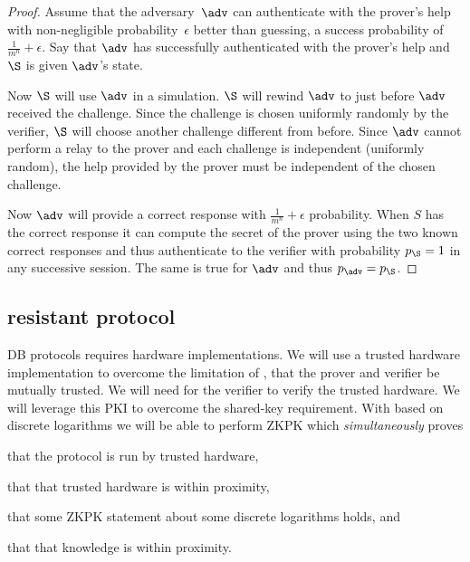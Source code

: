 \begin{proof}
  Assume that the adversary~\(\adv\) can authenticate with the prover's help 
  with non-negligible probability~\(\epsilon\) better than guessing, \ie a 
  success probability of \(\frac{1}{m^n}+\epsilon\).
  Say that \(\adv\) has successfully authenticated with the prover's help and 
  \(\S\) is given \(\adv\)'s state.

  Now \(\S\) will use \(\adv\) in a simulation.
  \(\S\) will rewind \(\adv\) to just before \(\adv\) received the challenge.
  Since the challenge is chosen uniformly randomly by the verifier, \(\S\) will 
  choose another challenge different from before.
  Since \(\adv\) cannot perform a relay to the prover and each challenge is 
  independent (uniformly random), the help provided by the prover must be 
  independent of the chosen challenge.

  Now \(\adv\) will provide a correct response with \(\frac{1}{m^n}+\epsilon\) 
  probability.
  When \(S\) has the correct response it can compute the secret of the prover 
  using the two known correct responses and thus authenticate to the verifier 
  with probability \(p_{\S} = 1\) in any successive session.
  The same is true for \(\adv\) and thus \(p_{\adv} = p_{\S}\).
\end{proof}

\subsection{ resistant protocol}

\Acl{DB} protocols requires hardware implementations.
We will use a trusted hardware implementation to overcome the limitation of 
\textcite{UWBPR}, \ie that the prover and verifier be mutually trusted.
We will need  for the verifier to verify the trusted hardware.
We will leverage this \ac{PKI} to overcome the shared-key requirement.
With  based on discrete logarithms we will be able to perform  
\ac{ZKPK} which \emph{simultaneously} proves
\begin{enumerate*}
\item that the protocol is run by trusted hardware,
\item that that trusted hardware is within proximity,
\item that some \ac{ZKPK} statement about some discrete logarithms holds, and
\item that that knowledge is within proximity.
\end{enumerate*}

